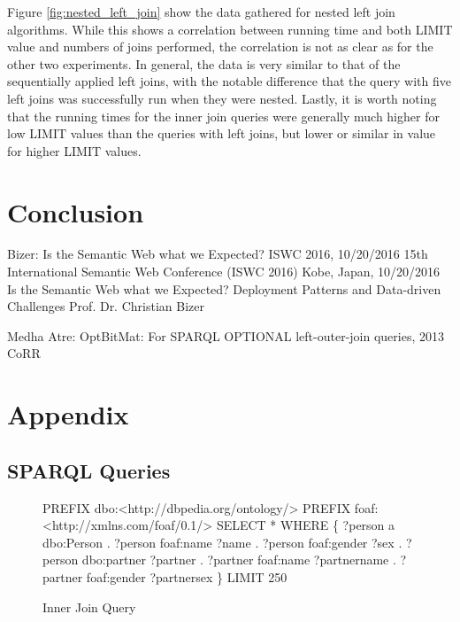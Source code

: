 \documentclass[10pt,a4paper]{article}
\begin{document}
	Figure \ref{fig:nested_left_join} show the data gathered for nested left join algorithms. While this shows a correlation between running time and both LIMIT value and numbers of joins performed, the correlation is not as clear as for the other two experiments. In general, the data is very similar to that of the sequentially applied left joins, with the notable difference that the query with five left joins was successfully run when they were nested. Lastly, it is worth noting that the running times for the inner join queries were generally much higher for low LIMIT values than the queries with left joins, but lower or similar in value for higher LIMIT values.

	\section*{Conclusion}
	
	\begin{thebibliography}{9}
		Bizer: Is the Semantic Web what we Expected? ISWC 2016, 10/20/2016 15th International Semantic Web Conference (ISWC 2016) Kobe, Japan, 10/20/2016 Is the Semantic Web what we Expected? Deployment Patterns and Data-driven Challenges Prof. Dr. Christian Bizer
		
		Medha Atre: OptBitMat: For SPARQL OPTIONAL left-outer-join queries, 2013 CoRR
	\end{thebibliography}

	\pagebreak
	\section*{Appendix}

	\subsection*{SPARQL Queries}

	\begin{figure}[h]
		\centering
		\begin{minipage}{0.5\textwidth}
			\begin{algorithmic}
				\STATE PREFIX dbo:\textless http://dbpedia.org/ontology/\textgreater
				\STATE PREFIX foaf: \textless http://xmlns.com/foaf/0.1/\textgreater
				\STATE SELECT *
				\STATE WHERE \{
				\STATE 	?person a dbo:Person .
				\STATE 	?person foaf:name ?name .
				\STATE 	?person foaf:gender ?sex .
				\STATE 	?person dbo:partner ?partner .
				\STATE 	?partner foaf:name ?partnername .
				\STATE 	?partner foaf:gender ?partnersex
				\STATE \}
				\STATE LIMIT 250
			\end{algorithmic}
			\caption{Inner Join Query}
			\label{alg:inner_join}
		\end{minipage}
	\end{figure}
	
\end{document}
